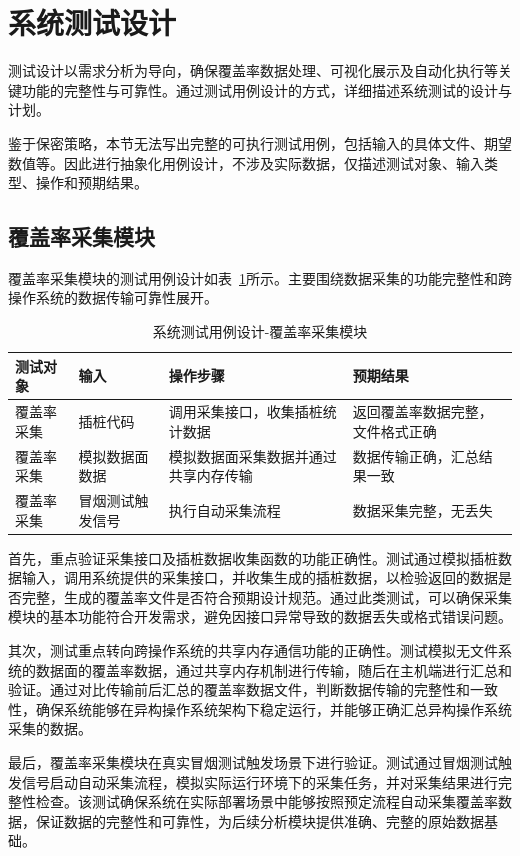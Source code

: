 \section{系统测试设计}
测试设计以需求分析为导向，确保覆盖率数据处理、可视化展示及自动化执行等关键功能的完整性与可靠性。通过测试用例设计的方式，详细描述系统测试的设计与计划。

鉴于保密策略，本节无法写出完整的可执行测试用例，包括输入的具体文件、期望数值等。因此进行抽象化用例设计，不涉及实际数据，仅描述测试对象、输入类型、操作和预期结果。

\subsection{覆盖率采集模块}
覆盖率采集模块的测试用例设计如表~\ref{tab:6.3}所示。主要围绕数据采集的功能完整性和跨操作系统的数据传输可靠性展开。

\begin{table}[ht]
\centering
\caption{系统测试用例设计-覆盖率采集模块}
\label{tab:6.3}
\begin{tabular}{p{2cm}p{2.5cm}p{4cm}p{4cm}}
\toprule
\textbf{测试对象} & \textbf{输入} & \textbf{操作步骤} & \textbf{预期结果} \\
\midrule
覆盖率采集 & 插桩代码 & 调用采集接口，收集插桩统计数据 & 返回覆盖率数据完整，文件格式正确 \\
覆盖率采集 & 模拟数据面数据 & 模拟数据面采集数据并通过共享内存传输 & 数据传输正确，汇总结果一致 \\
覆盖率采集 & 冒烟测试触发信号 & 执行自动采集流程 & 数据采集完整，无丢失 \\
\bottomrule
\end{tabular}
\end{table}

首先，重点验证采集接口及插桩数据收集函数的功能正确性。测试通过模拟插桩数据输入，调用系统提供的采集接口，并收集生成的插桩数据，以检验返回的数据是否完整，生成的覆盖率文件是否符合预期设计规范。通过此类测试，可以确保采集模块的基本功能符合开发需求，避免因接口异常导致的数据丢失或格式错误问题。

其次，测试重点转向跨操作系统的共享内存通信功能的正确性。测试模拟无文件系统的数据面的覆盖率数据，通过共享内存机制进行传输，随后在主机端进行汇总和验证。通过对比传输前后汇总的覆盖率数据文件，判断数据传输的完整性和一致性，确保系统能够在异构操作系统架构下稳定运行，并能够正确汇总异构操作系统采集的数据。

最后，覆盖率采集模块在真实冒烟测试触发场景下进行验证。测试通过冒烟测试触发信号启动自动采集流程，模拟实际运行环境下的采集任务，并对采集结果进行完整性检查。该测试确保系统在实际部署场景中能够按照预定流程自动采集覆盖率数据，保证数据的完整性和可靠性，为后续分析模块提供准确、完整的原始数据基础。

